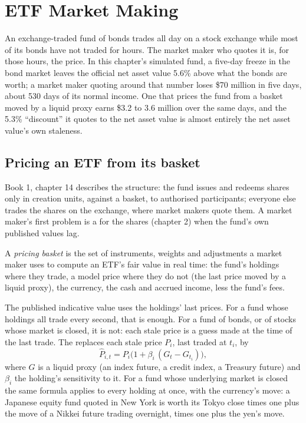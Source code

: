 \chapter{ETF Market Making}\label{ch:hf:etf-market-making}

An exchange-traded fund of bonds trades all day on a stock exchange while most of its bonds have not traded for hours. The market maker who
quotes it is, for those hours, the price. In this chapter's simulated fund, a five-day freeze in the bond market leaves the official net asset value
5.6\% above what the bonds are worth; a market maker quoting around that number loses \$70 million in five days, about 530 days of its normal
income. One that prices the fund from a basket moved by a liquid proxy earns \$3.2 to 3.6 million over the same days, and the 5.3\% ``discount'' it quotes
to the net asset value is almost entirely the net asset value's own staleness.

\section{Pricing an ETF from its basket}

Book 1, chapter 14 describes the structure: the fund issues and redeems shares only in creation units, against a basket, to authorised participants;
everyone else trades the shares on the exchange, where market makers quote them. A market maker's first problem is a  for the shares
(chapter 2) when the fund's own published values lag.

\begin{definition}\label{def:hf:etf-market-making:pricing}
A \emph{pricing basket} is the set of instruments, weights and adjustments a market maker uses to compute an ETF's fair value
in real time: the fund's holdings where they trade, a model price where they do not (the last price moved by a liquid proxy), the currency, the
cash and accrued income, less the fund's fees.
\end{definition}

The published indicative value uses the holdings' last prices. For a fund whose holdings all trade every second, that is enough. For a fund of
bonds, or of stocks whose market is closed, it is not: each stale price is a guess made at the time of the last trade. The  replaces
each stale price $P_i$, last traded at $t_i$, by
\[
\hat P_{i,t}=P_i\bigl(1+\beta_i\,(G_t-G_{t_i})\bigr),
\]
where $G$ is a liquid proxy (an index future, a credit index, a Treasury future) and $\beta_i$ the holding's sensitivity to it. For a fund whose
underlying market is closed the same formula applies to every holding at once, with the currency's move: a Japanese equity fund quoted in New York
is worth its Tokyo close times one plus the move of a Nikkei future trading overnight, times one plus the yen's move.


